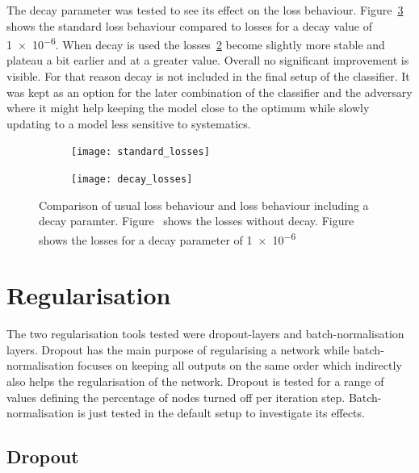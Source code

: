 The decay parameter was tested to see its effect on the loss behaviour. Figure~\ref{fig:decay} shows the standard loss behaviour compared to losses for a decay value of \num{1e-6}. When decay is used the losses~\ref{fig:decay:decay} become slightly more stable and plateau a bit earlier and at a greater value. Overall no significant improvement is visible. For that reason decay is not included in the final setup of the classifier. It was kept as an option for the later combination of the classifier and the adversary where it might help keeping the model close to the optimum while slowly updating to a model less sensitive to systematics.

\begin{figure}[htbp]
    \centering
    \begin{subfigure}[b]{0.45\textwidth}
        \texttt{[image: standard\_losses]}
        \caption{}
        \label{fig:decay:standard}
    \end{subfigure}
\quad
    \begin{subfigure}[b]{0.45\textwidth}
        \texttt{[image: decay\_losses]}
        \caption{}
        \label{fig:decay:decay}
    \end{subfigure}
    \caption[Performance of the classifier with decay]{Comparison of usual loss behaviour and loss behaviour including a decay paramter. Figure~ shows the losses without decay. Figure~ shows the losses for a decay parameter of \num{1e-6}}
	\label{fig:decay}
\end{figure}




\section{Regularisation}

The two regularisation tools tested were dropout-layers and batch-normalisation layers. Dropout has the main purpose of regularising a network while batch-normalisation focuses on keeping all outputs on the same order which indirectly also helps the regularisation of the network.
Dropout is tested for a range of values defining the percentage of nodes turned off per iteration step. Batch-normalisation is just tested in the default setup to investigate its effects.

\subsection{Dropout}
\label{sec:dropout}

